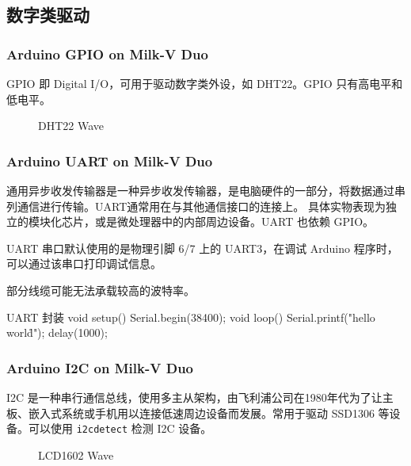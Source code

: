 \documentclass[xcolor=table,dvipsnames,svgnames,aspectratio=169]{ctexbeamer}
\begin{document}
\subsection{数字类驱动}

\begin{frame}
  \frametitle{Arduino GPIO on Milk-V Duo}

  GPIO 即 Digital I/O，可用于驱动数字类外设，如 DHT22。GPIO 只有高电平和低电平。

  \begin{figure}
    \centering
    \caption{DHT22 Wave}
  \end{figure}

\end{frame}

\begin{frame}
  \frametitle{Arduino UART on Milk-V Duo}

  通用异步收发传输器是一种异步收发传输器，是电脑硬件的一部分，将数据通过串列通信进行传输。UART通常用在与其他通信接口的连接上。 具体实物表现为独立的模块化芯片，或是微处理器中的内部周边设备。UART 也依赖 GPIO。

  UART 串口默认使用的是物理引脚 6/7 上的 UART3，在调试 Arduino 程序时，可以通过该串口打印调试信息。

  部分线缆可能无法承载较高的波特率。

  \newpage

  \begin{codeblock}{UART 封装}
void setup() {
  Serial.begin(38400);
}
void loop() {
  Serial.printf("hello world\r\n");
  delay(1000);
}
\end{codeblock}
\end{frame}

\begin{frame}
  \frametitle{Arduino I2C on Milk-V Duo}

  I2C 是一种串行通信总线，使用多主从架构，由飞利浦公司在1980年代为了让主板、嵌入式系统或手机用以连接低速周边设备而发展。常用于驱动 SSD1306 等设备。可以使用 \lstinline|i2cdetect| 检测 I2C 设备。

  \begin{figure}
    \centering
    \caption{LCD1602 Wave}
  \end{figure}

\end{frame}
\end{document}
